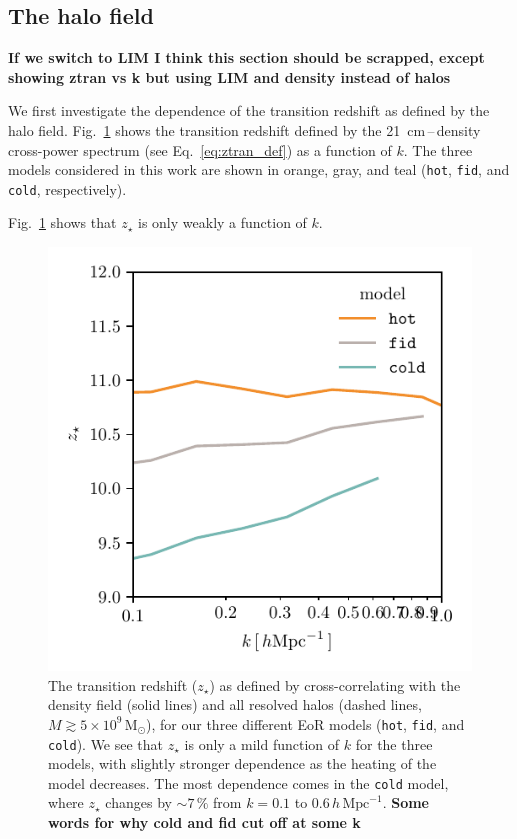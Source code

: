\documentclass[a4paper,fleqn,usenatbib]{mnras}
\newcommand{\Msun}{\ensuremath{\text{M}_\odot}}
\newcommand{\hoverMpc}{\ensuremath{h\,\text{Mpc}^{-1}}}
\newcommand{\fid}{\texttt{fid}}
\newcommand{\hot}{\texttt{hot}}
\newcommand{\cold}{\texttt{cold}}
\newcommand{\zst}{\ensuremath{z_{\star}}}
\begin{document}
\subsection{The halo field}
{\bf If we switch to LIM I think this section should be scrapped, except
showing ztran vs k but using LIM and density instead of halos}

We first investigate the dependence of the transition redshift as defined by
the halo field. Fig.~\ref{fig:ztran_vs_k} shows the transition redshift
defined by the 21~cm\,--\,density cross-power spectrum (see
Eq.~\ref{eq:ztran_def}) as a function of $k$. The three models considered in
this work are shown in orange, gray, and teal (\hot{}, \fid{}, and \cold{},
respectively).

Fig.~\ref{fig:ztran_vs_k} shows that \zst{} is only weakly a function of $k$. 

\begin{figure}
\includegraphics[width=\columnwidth]{plots/ztran_vs_k.pdf}
\caption{The transition redshift ($\zst$) as defined by cross-correlating with the
density field (solid lines) and all resolved halos (dashed lines, $M\gtrsim
5\times10^9\,\Msun$), for our three different EoR models (\hot{}, \fid{}, and
\cold{}). We see that \zst{} is only a mild function of $k$ for the three
models, with slightly stronger dependence as the heating of the model
decreases. The most dependence comes in the \cold{} model, where \zst{}
changes by $\sim7\,\%$ from $k=0.1$ to $0.6\,\hoverMpc$. {\bf Some words for
why cold and fid cut off at some k}}
\label{fig:ztran_vs_k}
\end{figure}
\end{document}
